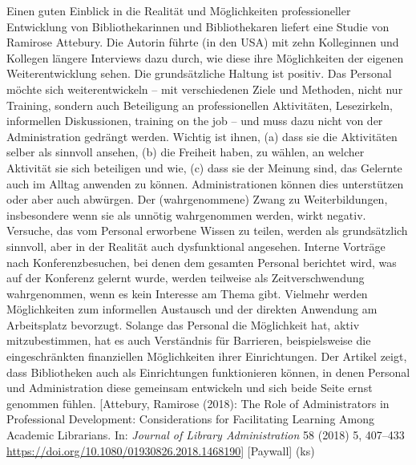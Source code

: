 \documentclass[a4paper,
fontsize=11pt,
oneside,
numbers=noperiodatend,
parskip=half-,
bibliography=totoc,
final
]{scrartcl}
\begin{document}
Einen guten Einblick in die Realität und Möglichkeiten professioneller
Entwicklung von Bibliothekarinnen und Bibliothekaren liefert eine Studie
von Ramirose Attebury. Die Autorin führte (in den USA) mit zehn
Kolleginnen und Kollegen längere Interviews dazu durch, wie diese ihre
Möglichkeiten der eigenen Weiterentwicklung sehen. Die grundsätzliche
Haltung ist positiv. Das Personal möchte sich weiterentwickeln -- mit
verschiedenen Ziele und Methoden, nicht nur Training, sondern auch
Beteiligung an professionellen Aktivitäten, Lesezirkeln, informellen
Diskussionen, training on the job -- und muss dazu nicht von der
Administration gedrängt werden. Wichtig ist ihnen, (a) dass sie die
Aktivitäten selber als sinnvoll ansehen, (b) die Freiheit haben, zu
wählen, an welcher Aktivität sie sich beteiligen und wie, (c) dass sie
der Meinung sind, das Gelernte auch im Alltag anwenden zu können.
Administrationen können dies unterstützen oder aber auch abwürgen. Der
(wahrgenommene) Zwang zu Weiterbildungen, insbesondere wenn sie als
unnötig wahrgenommen werden, wirkt negativ. Versuche, das vom Personal
erworbene Wissen zu teilen, werden als grundsätzlich sinnvoll, aber in
der Realität auch dysfunktional angesehen. Interne Vorträge nach
Konferenzbesuchen, bei denen dem gesamten Personal berichtet wird, was
auf der Konferenz gelernt wurde, werden teilweise als Zeitverschwendung
wahrgenommen, wenn es kein Interesse am Thema gibt. Vielmehr werden
Möglichkeiten zum informellen Austausch und der direkten Anwendung am
Arbeitsplatz bevorzugt. Solange das Personal die Möglichkeit hat, aktiv
mitzubestimmen, hat es auch Verständnis für Barrieren, beispielsweise
die eingeschränkten finanziellen Möglichkeiten ihrer Einrichtungen. Der
Artikel zeigt, dass Bibliotheken auch als Einrichtungen funktionieren
können, in denen Personal und Administration diese gemeinsam entwickeln
und sich beide Seite ernst genommen fühlen. {[}Attebury, Ramirose
(2018): The Role of Administrators in Professional Development:
Considerations for Facilitating Learning Among Academic Librarians. In:
\emph{Journal of Library Administration} 58 (2018) 5, 407--433
\url{https://doi.org/10.1080/01930826.2018.1468190}{]} {[}Paywall{]}
(ks)
\end{document}
